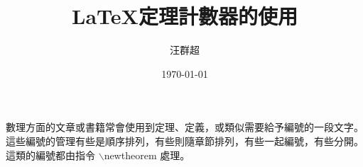 
\usepackage{amsthm}						%
\theoremstyle{plain}

\newtheorem{de}{定義}[section]		%
\newtheorem{thm}{{\MB 定理}}[section]		%
\newtheorem{lemma}[thm]{Lemma}			%
\newtheorem{ex}{{\E Example}}				%

\newtheorem{cor}{Corollary}[section]		%
\newtheorem{exercise}{EXERCISE}			%
\newtheorem{re}{\emph{Result}}[section]	%
\newtheorem{axiom}{AXIOM}				%
\renewcommand{\proofname}{證明}			%

\setcounter{quiz}{1}						%

\title{ \LaTeX {\MB 定理計數器的使用}}
\author{{\MB 汪群超}}
\date{{\TT \today}} 			 

\maketitle
\fontsize{12}{22pt}\selectfont

數理方面的文章或書籍常會使用到定理、定義，或類似需要給予編號的一段文字。這些編號的管理有些是順序排列，有些則隨章節排列，有些一起編號，有些分開。這類的編號都由指令 {\A $\backslash$newtheorem} 處理。  

